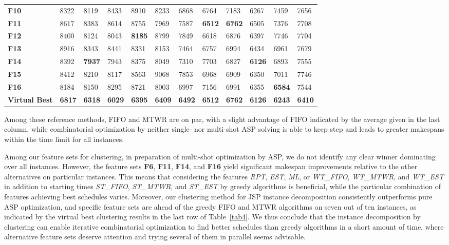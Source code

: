 \documentclass[runningheads]{llncs}
\newcommand{\stest}{\textit{ST\_EST}\xspace}
\newcommand{\stmtwr}{\textit{ST\_MTWR}\xspace}
\newcommand{\stfifo}{\textit{ST\_FIFO}\xspace}
\newcommand{\wtest}{\textit{WT\_EST}\xspace}
\newcommand{\wtmtwr}{\textit{WT\_MTWR}\xspace}
\newcommand{\wtfifo}{\textit{WT\_FIFO}\xspace}
\begin{document}
\begin{table}[bt]
\begin{center}
\begin{tabular}{|l|l|l|l|l|l|l|l|l|l|l|l|}
      \textbf{F10}  & 8322  & 8119  & 8433 & 8910 & 8233 & 6868 & 6764 & 7183 & 6267 & 7459 & 7656 \\
      \textbf{F11} & 8617  & 8383  & 8614 & 8755 & 7969 & 7587 & \textbf{6512} & \textbf{6762}& 6505 & 7376 & 7708 \\
      \textbf{F12} & 8400  & 8124  & 8043 & \textbf{8185} & 8799 & 7849 & 6618 & 6876 & 6397 & 7746 & 7704 \\
      \textbf{F13} & 8916 & 8343  & 8441 & 8331 & 8153 & 7464 & 6757 & 6994 & 6434 & 6961 & 7679 \\
      \textbf{F14} & 8392  & \textbf{7937} & 7943 & 8375 & 8049 & 7310 & 7703 & 6827 & \textbf{6126} & 6893 & 7555 \\
      \textbf{F15} & 8412  & 8210  & 8117 & 8563 & 9068 & 7853 & 6968 & 6909 & 6350  & 7011 & 7746 \\
      \textbf{F16} & 8184 & 8150 & 8295 & 8721 & 8003 & 6997 & 7156 & 6991 & 6355 & \textbf{6584} & 7544 \\ 
      \textbf{Virtual Best} & \textbf{6817} & \textbf{6318} & \textbf{6029} & \textbf{6395} & \textbf{6409} & \textbf{6492} & \textbf{6512} & \textbf{6762} & \textbf{6126} & \textbf{6243} & \textbf{6410} \\
\hline
      \end{tabular}
  \end{center}
\end{table}

Among these reference methods, FIFO and MTWR are on par, with a slight advantage of FIFO indicated
by the average given in the last column, while combinatorial optimization by neither single- nor multi-shot ASP 
solving is able to keep step and leads to greater makespans within the time limit for all instances.

Among our feature sets for clustering, in preparation of multi-shot optimization by ASP,
we do not identify any clear winner dominating over all instances.
However, the feature sets \textbf{F6}, \textbf{F11}, \textbf{F14}, and \textbf{F16}
yield significant makespan improvements relative to the other alternatives on particular instances.
This means that considering the features \textit{RPT}, \textit{EST}, \textit{ML}, or
\wtfifo, \wtmtwr, and \wtest in addition to starting times \stfifo, \stmtwr, and \stest by
greedy algorithms is beneficial, while the particular combination of features achieving best schedules varies.
Moreover, our clustering method for JSP instance decomposition consistently outperforms pure ASP optimization,
and specific feature sets are ahead of the greedy FIFO and MTWR algorithms on seven out of ten instances,
as indicated by the virtual best clustering results in the last row of Table~\ref{tab4}.
We thus conclude that the instance decomposition by clustering can enable iterative combinatorial optimization
to find better schedules than greedy algorithms in a short amount of time, where alternative feature sets deserve
attention and trying several of them in parallel seems advisable.
\end{document}
